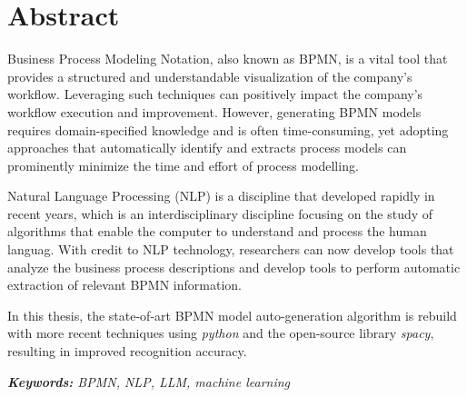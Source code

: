 \chapter*{Abstract}
\noindent
Business Process Modeling Notation, also known as BPMN, is a vital tool that provides a structured and understandable visualization of the company's workflow. Leveraging such techniques can positively impact the company's workflow execution and improvement. However, generating BPMN models requires domain-specified knowledge and is often time-consuming, yet adopting approaches that automatically identify and extracts process models can prominently minimize the time and effort of process modelling.

Natural Language Processing (NLP) is a discipline that developed rapidly in recent years, which is an interdisciplinary discipline focusing on the study of algorithms that enable the computer to understand and process the human languag. With credit to NLP technology, researchers can now develop tools that analyze the business process descriptions and develop tools to perform automatic extraction of relevant BPMN information.

In this thesis, the state-of-art BPMN model auto-generation algorithm is rebuild with more recent techniques using \textit{python} and the open-source library \textit{spacy}, resulting in improved recognition accuracy.

\textit{\textbf{Keywords: }BPMN, NLP, LLM, machine learning}
